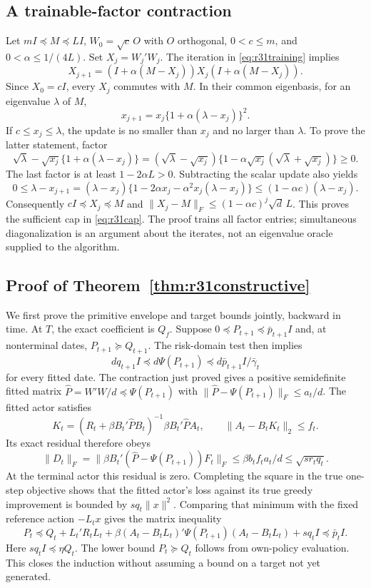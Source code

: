 \subsection{A trainable-factor contraction}
Let $mI\preceq M\preceq LI$, $W_0=\sqrt c\,O$ with $O$ orthogonal,
$0<c\leq m$, and $0<\alpha\leq1/(4L)$. Set $X_j=W_j'W_j$.
The iteration in \eqref{eq:r31training} implies
\[
 X_{j+1}=(I+\alpha(M-X_j))X_j(I+\alpha(M-X_j)).
\]
Since $X_0=cI$, every $X_j$ commutes with $M$. In their common eigenbasis,
for an eigenvalue $\lambda$ of $M$,
\[
 x_{j+1}=x_j\{1+\alpha(\lambda-x_j)\}^2.
\]
If $c\leq x_j\leq\lambda$, the update is no smaller than $x_j$ and no
larger than $\lambda$. To prove the latter statement, factor
\[
 \sqrt\lambda-\sqrt{x_j}\{1+\alpha(\lambda-x_j)\}
 =(\sqrt\lambda-\sqrt{x_j})
       \{1-\alpha\sqrt{x_j}(\sqrt\lambda+\sqrt{x_j})\}\geq0.
\]
The last factor is at least $1-2\alpha L>0$. Subtracting the scalar update
also yields
\[
 0\leq\lambda-x_{j+1}
  =(\lambda-x_j)
     \{1-2\alpha x_j-\alpha^2x_j(\lambda-x_j)\}
  \leq(1-\alpha c)(\lambda-x_j).
\]
Consequently $cI\preceq X_j\preceq M$ and
$\|X_j-M\|_F\leq(1-\alpha c)^j\sqrt d\,L$.
This proves the sufficient cap in \eqref{eq:r31cap}. The proof trains all
factor entries; simultaneous diagonalization is an argument about the
iterates, not an eigenvalue oracle supplied to the algorithm.

\subsection{Proof of Theorem~\ref{thm:r31constructive}}
We first prove the primitive envelope and target bounds jointly, backward
in time. At $T$, the exact coefficient is $Q_f$. Suppose
$0\preceq P_{t+1}\preceq\bar p_{t+1}I$ and, at nonterminal dates,
$P_{t+1}\succeq Q_{t+1}$. The risk-domain test then implies
\[
 dq_{t+1}I\preceq d\Psi(P_{t+1})
       \preceq d\bar p_{t+1}I/\bar\gamma_t
\]
for every fitted date. The contraction just proved gives a positive
semidefinite fitted matrix $\widehat P= W'W/d\preceq\Psi(P_{t+1})$ with
$\|\widehat P-\Psi(P_{t+1})\|_F\leq a_t/d$.
The fitted actor satisfies
\[
 K_t=(R_t+\beta B_t'\widehat P B_t)^{-1}
                         \beta B_t'\widehat P A_t,
 \qquad \|A_t-B_tK_t\|_2\leq f_t.
\]
Its exact residual therefore obeys
\[
 \|D_t\|_F
 =\|\beta B_t'(\widehat P-\Psi(P_{t+1}))F_t\|_F
 \leq\beta b_tf_ta_t/d\leq\sqrt{s r_tq_t}.
\]
At the terminal actor this residual is zero. Completing the square in the
true one-step objective shows that the fitted actor's loss against its true
greedy improvement is bounded by $s q_t\|x\|^2$. Comparing that minimum
with the fixed reference action $-L_tx$ gives the matrix inequality
\[
 P_t\preceq Q_t+L_t'R_tL_t+
         \beta(A_t-B_tL_t)'\Psi(P_{t+1})(A_t-B_tL_t)+s q_tI
       \preceq\bar p_tI.
\]
Here $s q_tI\preceq\eta Q_t$. The lower bound $P_t\succeq Q_t$ follows
from own-policy evaluation. This closes the induction without assuming a
bound on a target not yet generated.

